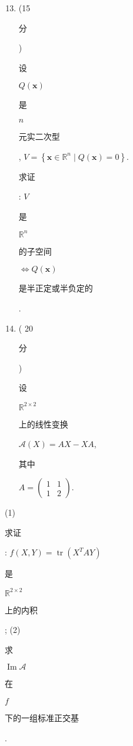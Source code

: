 \documentclass[10pt]{article}
\begin{document}
\begin{enumerate}
  \setcounter{enumi}{12}
  \item (15 \begin{CJK}{UTF8}{mj}分\end{CJK}) \begin{CJK}{UTF8}{mj}设\end{CJK} $Q(\mathbf{x})$ \begin{CJK}{UTF8}{mj}是\end{CJK} $n$ \begin{CJK}{UTF8}{mj}元实二次型\end{CJK}, $V=\left\{\mathbf{x} \in \mathbb{R}^{n} \mid Q(\mathbf{x})=0\right\}$. \begin{CJK}{UTF8}{mj}求证\end{CJK}: $V$ \begin{CJK}{UTF8}{mj}是\end{CJK} $\mathbb{R}^{n}$ \begin{CJK}{UTF8}{mj}的子空间\end{CJK} $\Leftrightarrow Q(\mathbf{x})$ \begin{CJK}{UTF8}{mj}是半正定或半负定的\end{CJK}.

  \item ( 20 \begin{CJK}{UTF8}{mj}分\end{CJK}) \begin{CJK}{UTF8}{mj}设\end{CJK} $\mathbb{R}^{2 \times 2}$ \begin{CJK}{UTF8}{mj}上的线性变换\end{CJK} $\mathscr{A}(X)=A X-X A$, \begin{CJK}{UTF8}{mj}其中\end{CJK} $A=\left(\begin{array}{ll}1 & 1 \\ 1 & 2\end{array}\right)$.

\end{enumerate}
(1) \begin{CJK}{UTF8}{mj}求证\end{CJK}: $f(X, Y)=\operatorname{tr}\left(X^{T} A Y\right)$ \begin{CJK}{UTF8}{mj}是\end{CJK} $\mathbb{R}^{2 \times 2}$ \begin{CJK}{UTF8}{mj}上的内积\end{CJK}; (2) \begin{CJK}{UTF8}{mj}求\end{CJK} $\operatorname{Im} \mathscr{A}$ \begin{CJK}{UTF8}{mj}在\end{CJK} $f$ \begin{CJK}{UTF8}{mj}下的一组标准正交基\end{CJK}.
\end{document}
